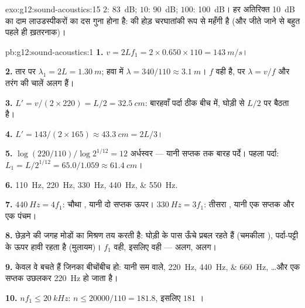 \begin{solution}{exo:g12:sound-acoustics:15}
$2$: \qty{83}{dB}; $10$: \qty{90}{dB}; $100$: \qty{100}{dB}। हर अतिरिक्त \qty{+10}{dB} का दाम
लाउडस्पीकरों का दस गुना होना है:  की होड़ चरघातांकी रूप से
महँगी है (और जीते जाने से बहुत पहले ही ख़तरनाक)।
\end{solution}

\begin{solution}{pb:g12:sound-acoustics:1}
\textbf{1.} $v = 2Lf_1 = 2 \times 0.650 \times 110 = \qty{143}{m/s}$।

\textbf{2.} तार पर $\lambda_1 = 2L = \qty{1.30}{m}$; हवा में $\lambda = 340/110 \approx \qty{3.1}{m}$। $f$ वही है, पर $\lambda = v/f$ और
तरंग की चालें अलग हैं।

\textbf{3.} $L' = v/(2 \times 220) = L/2 = \qty{32.5}{cm}$: बारहवाँ पर्दा ठीक बीच में, घोड़ी से $L/2$ पर बैठता है।

\textbf{4.} $L' = 143/(2 \times 165) \approx \qty{43.3}{cm} = 2L/3$।

\textbf{5.} $\log(220/110)/\log 2^{1/12} = 12$ अर्धस्वर --- यानी सप्तक तक बारह पर्दे। पहला पर्दा:
$L_1 = L/2^{1/12} = 65.0/1.059
\approx \qty{61.4}{cm}$।

\textbf{6.} \qtylist{110;220;330;440;550}{Hz}.

\textbf{7.} $\qty{440}{Hz} = 4f_1$: चौथा , यानी दो सप्तक ऊपर। $\qty{330}{Hz} = 3f_1$: तीसरा
, यानी एक सप्तक और एक पंचम।

\textbf{8.} छेड़ने की जगह मोडों का मिश्रण तय करती है: घोड़ी के पास ऊँचे
 प्रबल रहते हैं (चमकीला ), पर्दा-पट्टी के ऊपर
 हावी रहता है (मुलायम)। $f_1$ वही, इसलिए 
वही ---  अलग,  अलग।

\textbf{9.} केवल वे  बचते हैं जिनका बीचोंबीच 
हो: यानी सम वाले, \qtylist{220;440;660}{Hz}, \dots और  एक
सप्तक उछलकर \qty{220}{Hz} हो जाता है।

\textbf{10.} $nf_1 \le \qty{20}{kHz}$: $n \le 20000/110 = 181.8$, इसलिए $181$ ।


\end{solution}
